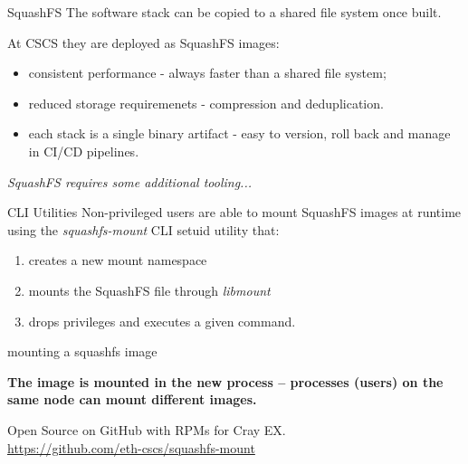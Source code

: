 \documentclass[aspectratio=43]{beamer}
\begin{document}
\begin{frame}[fragile]{SquashFS}
    The software stack can be copied to a shared file system once built.

    \vspace{20pt}

    At CSCS they are deployed as SquashFS images:
    \begin{itemize}
        \item consistent performance - always faster than a shared file system;
        \item reduced storage requiremenets - compression and deduplication.
        \item each stack is a single binary artifact - easy to version, roll back and manage in CI/CD pipelines.
    \end{itemize}

    \vspace{20pt}

    \begin{center}
    \emph{SquashFS requires some additional tooling...}
    \end{center}
\end{frame}

\begin{frame}[fragile]{CLI Utilities}
    Non-privileged users are able to mount SquashFS images at runtime using the \emph{squashfs-mount} CLI setuid utility that:
    \begin{enumerate}
    \item creates a new mount namespace
    \item mounts the SquashFS file through \emph{libmount}
    \item drops privileges and executes a given command.
    \end{enumerate}

    \begin{code}{mounting a squashfs image}

    \end{code}

    \begin{center}
        \textbf{The image is mounted in the new process -- processes (users) on the same node can mount different images.}
    \end{center}

    \vspace{10pt}

    Open Source on GitHub with RPMs for Cray EX.\\\url{https://github.com/eth-cscs/squashfs-mount}
\end{frame}
\end{document}
